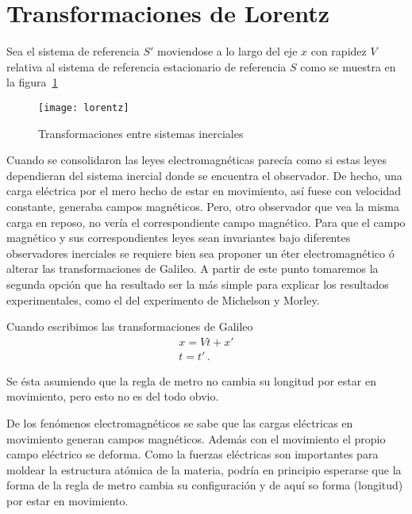 \section{Transformaciones de Lorentz}
\begin{frame}
Sea el sistema de referencia $S'$ moviendose a lo largo del eje $x$ con rapidez $V$ relativa al sistema de referencia estacionario de referencia $S$ como se muestra en la figura~\ref{fig:lorentz}
\begin{figure}
  \centering
  \texttt{[image: lorentz]}
  \caption{Transformaciones entre sistemas inerciales}
  \label{fig:lorentz}
\end{figure}

\begin{details} %
Cuando se consolidaron las leyes electromagnéticas parecía como si
estas leyes dependieran del sistema inercial donde se encuentra el
observador. De hecho, una carga eléctrica por el mero hecho de estar
en movimiento, así fuese con velocidad constante, generaba campos
magnéticos. Pero, otro observador que vea la misma carga en reposo, no
vería el correspondiente campo magnético. Para que el campo magnético
y sus correspondientes leyes sean invariantes bajo diferentes
observadores inerciales se requiere bien sea proponer un éter
electromagnético ó alterar las transformaciones de Galileo. A partir
de este punto tomaremos la segunda opción que ha resultado ser la más
simple para explicar los resultados experimentales, como el del
experimento de Michelson y Morley.
\end{details}

Cuando escribimos las transformaciones de Galileo
\begin{align*}
  x=Vt+x'\nonumber\\
  t=t'\,.
\end{align*}



Se ésta asumiendo que la regla de metro no cambia su longitud por
estar en movimiento, pero esto no es del todo obvio.  
\begin{details}
De los fenómenos
electromagnéticos se sabe que las cargas eléctricas en movimiento
generan campos magnéticos. Además con el movimiento el propio campo
eléctrico se deforma. Como la fuerzas eléctricas son importantes para
moldear la estructura atómica de la materia, podría en principio
esperarse que la forma de la regla de metro cambia su configuración y
de aquí so forma (longitud) por estar en movimiento.
\end{details}
\end{frame}



